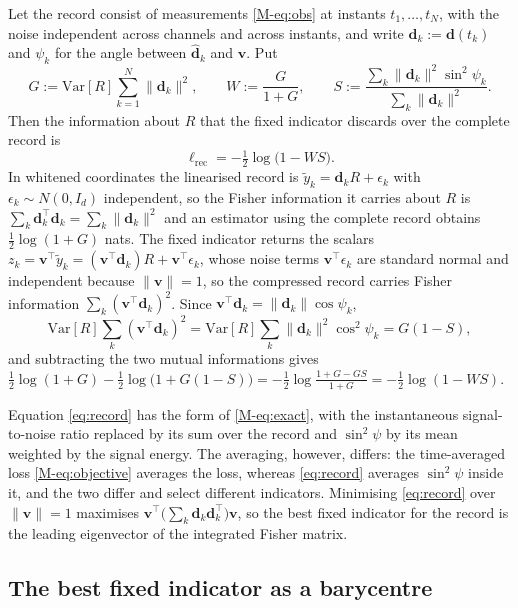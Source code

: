 \documentclass[12pt]{article}
\newcommand{\dvec}{\mathbf{d}}
\newcommand{\dhat}{\hat{\mathbf{d}}}
\newcommand{\Var}{\mathrm{Var}}
\newcommand{\lloss}{\ell}
\begin{document}
Let the record consist of measurements \eqref{M-eq:obs} at instants
$t_1,\dots,t_N$, with the noise independent across channels and across
instants, and write $\dvec_k:=\dvec(t_k)$ and $\psi_k$ for the angle between
$\dhat_k$ and $\mathbf v$. Put
\[
G:=\Var[R]\sum_{k=1}^{N}\|\dvec_k\|^{2},\qquad W:=\frac{G}{1+G},\qquad
S:=\frac{\sum_{k}\|\dvec_k\|^{2}\sin^{2}\psi_k}{\sum_{k}\|\dvec_k\|^{2}} .
\]
Then the information about $R$ that the fixed indicator discards over the
complete record is
\begin{equation}
\lloss_{\mathrm{rec}}=-\tfrac12\log\big(1-W S\big).
\label{eq:record}
\end{equation}
In whitened coordinates the linearised record is $\tilde y_k=\dvec_k R+\epsilon_k$ with $\epsilon_k\sim N(0,I_d)$ independent, so the Fisher information it carries about $R$ is $\sum_k\dvec_k^{\top}\dvec_k=\sum_k\|\dvec_k\|^{2}$ and an estimator using the complete record obtains $\tfrac12\log(1+G)$ nats. The fixed indicator returns the scalars $z_k=\mathbf v^{\top}\tilde y_k=(\mathbf v^{\top}\dvec_k)R+\mathbf v^{\top}\epsilon_k$, whose noise terms $\mathbf v^{\top}\epsilon_k$ are standard normal and independent because $\|\mathbf v\|=1$, so the compressed record carries Fisher information $\sum_k(\mathbf v^{\top}\dvec_k)^{2}$. Since $\mathbf v^{\top}\dvec_k=\|\dvec_k\|\cos\psi_k$,
\[
\Var[R]\sum_k(\mathbf v^{\top}\dvec_k)^{2}
=\Var[R]\sum_k\|\dvec_k\|^{2}\cos^{2}\psi_k=G(1-S),
\]
and subtracting the two mutual informations gives $\tfrac12\log(1+G)-\tfrac12\log\big(1+G(1-S)\big)=-\tfrac12\log\frac{1+G-GS}{1+G}=-\tfrac12\log(1-WS)$.

Equation \eqref{eq:record} has the form of \eqref{M-eq:exact}, with the
instantaneous signal-to-noise ratio replaced by its sum over the record and
$\sin^{2}\psi$ by its mean weighted by the signal energy. The averaging,
however, differs: the time-averaged loss \eqref{M-eq:objective} averages the
loss, whereas \eqref{eq:record} averages $\sin^{2}\psi$ inside it, and the
two differ and select different indicators. Minimising \eqref{eq:record} over
$\|\mathbf v\|=1$ maximises $\mathbf v^{\top}\big(\sum_k\dvec_k\dvec_k^{\top}\big)\mathbf v$,
so the best fixed indicator for the record is the leading eigenvector of the
integrated Fisher matrix.

\subsection{The best fixed indicator as a barycentre}
\end{document}
